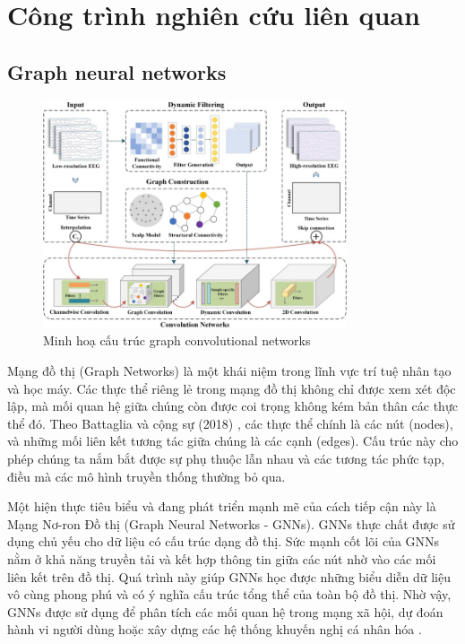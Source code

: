 \chapter{Công trình nghiên cứu liên quan}
\label{chap:chap2}
\section{Graph neural networks}

\begin{figure}
    \centering
    \includegraphics[width = 0.8\textwidth]{imgs/graph-convolutional-networks.jpg}
    \caption{Minh hoạ cấu trúc graph convolutional networks}
    \label{fig:CF_CBF}
\end{figure}
Mạng đồ thị (Graph Networks) là một khái niệm trong lĩnh vực trí tuệ nhân tạo và học máy. Các thực thể riêng lẻ trong mạng đồ thị không chỉ được xem xét độc lập, mà mối quan hệ giữa chúng còn được coi trọng không kém bản thân các thực thể đó. Theo Battaglia và cộng sự (2018) \cite{battaglia2018relational}, các thực thể chính là các nút (nodes), và những mối liên kết tương tác giữa chúng là các cạnh (edges). Cấu trúc này cho phép chúng ta nắm bắt được sự phụ thuộc lẫn nhau và các tương tác phức tạp, điều mà các mô hình truyền thống thường bỏ qua.

Một hiện thực tiêu biểu và đang phát triển mạnh mẽ của cách tiếp cận này là Mạng Nơ-ron Đồ thị (Graph Neural Networks - GNNs). GNNs thực chất được sử dụng chủ yếu cho dữ liệu có cấu trúc dạng đồ thị. Sức mạnh cốt lõi của GNNs nằm ở khả năng truyền tải và kết hợp thông tin giữa các nút nhờ vào các mối liên kết trên đồ thị. Quá trình này giúp GNNs học được những biểu diễn dữ liệu vô cùng phong phú và có ý nghĩa cấu trúc tổng thể của toàn bộ đồ thị. Nhờ vậy, GNNs được sử dụng để phân tích các mối quan hệ trong mạng xã hội, dự đoán hành vi người dùng hoặc xây dựng các hệ thống khuyến nghị cá nhân hóa \cite{wu2022graph, gao2022hetinf, min2021stgsn}.

